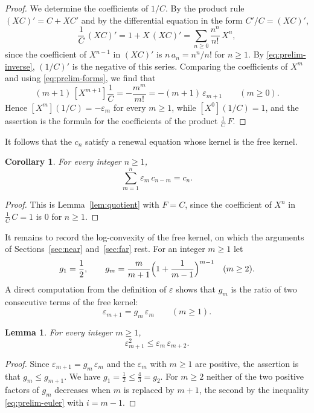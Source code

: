 \documentclass{amsart}
\newtheorem{lemma}[theorem]{Lemma}
\newtheorem{corollary}[theorem]{Corollary}
\theoremstyle{definition}
\theoremstyle{remark}
\numberwithin{equation}{section}
\begin{document}
\begin{proof}
We determine the coefficients of $1/C$. By the product rule $(XC)'=C+XC'$ and by the differential equation in the form $C'/C=(XC)'$,
\[
\frac{1}{C}\,(XC)'=1+X\,(XC)'=\sum_{n\ge 0}\frac{n^n}{n!}\,X^n,
\]
since the coefficient of $X^{n-1}$ in $(XC)'$ is $n\,a_n=n^n/n!$ for $n\ge 1$. By \eqref{eq:prelim-inverse}, $(1/C)'$ is the negative of this series. Comparing the coefficients of $X^m$ and using \eqref{eq:prelim-forms}, we find that
\[
(m+1)\,[X^{m+1}]\frac{1}{C}=-\frac{m^m}{m!}=-(m+1)\,\varepsilon_{m+1}\qquad(m\ge 0).
\]
Hence $[X^m](1/C)=-\varepsilon_m$ for every $m\ge 1$, while $[X^0](1/C)=1$, and the assertion is the formula for the coefficients of the product $\frac1C\,F$.
\end{proof}

It follows that the $c_n$ satisfy a renewal equation whose kernel is the free kernel.

\begin{corollary}\label{cor:crenewal}
For every integer $n\ge 1$,
\[
\sum_{m=1}^{n}\varepsilon_m\,c_{n-m}=c_n.
\]
\end{corollary}

\begin{proof}
This is Lemma~\ref{lem:quotient} with $F=C$, since the coefficient of $X^n$ in $\frac1C\,C=1$ is $0$ for $n\ge 1$.
\end{proof}

It remains to record the log-convexity of the free kernel, on which the arguments of Sections~\ref{sec:near} and~\ref{sec:far} rest. For an integer $m\ge 1$ let
\[
g_1=\frac12,\qquad g_m=\frac{m}{m+1}\Bigl(1+\frac{1}{m-1}\Bigr)^{m-1}\quad(m\ge 2).
\]
A direct computation from the definition of $\varepsilon$ shows that $g_m$ is the ratio of two consecutive terms of the free kernel:
\[
\varepsilon_{m+1}=g_m\,\varepsilon_m\qquad(m\ge 1).
\]

\begin{lemma}\label{lem:freelogconvex}
For every integer $m\ge 1$,
\[
\varepsilon_{m+1}^2\le\varepsilon_m\,\varepsilon_{m+2}.
\]
\end{lemma}

\begin{proof}
Since $\varepsilon_{m+1}=g_m\,\varepsilon_m$ and the $\varepsilon_m$ with $m\ge 1$ are positive, the assertion is that $g_m\le g_{m+1}$. We have $g_1=\frac12\le\frac43=g_2$. For $m\ge 2$ neither of the two positive factors of $g_m$ decreases when $m$ is replaced by $m+1$, the second by the inequality \eqref{eq:prelim-euler} with $i=m-1$.
\end{proof}
\end{document}
